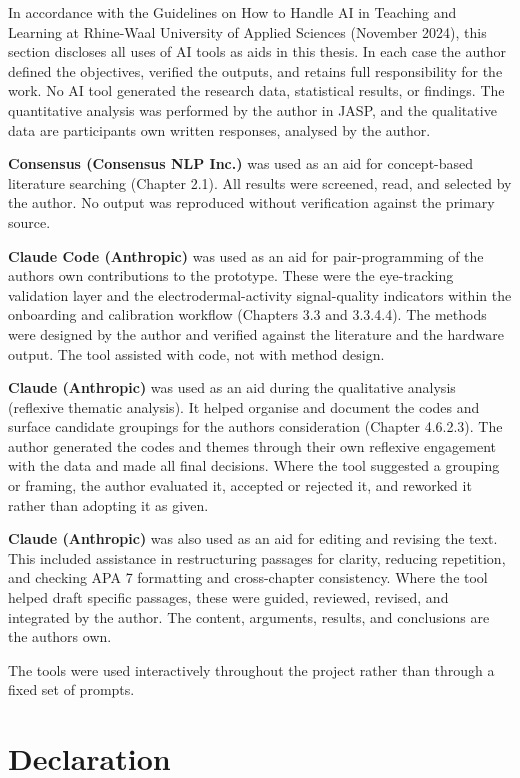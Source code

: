 \documentclass[
]{article}
\begin{document}
In accordance with the Guidelines on How to Handle AI in Teaching and Learning at Rhine-Waal University of Applied Sciences (November 2024), this section discloses all uses of AI tools as aids in this thesis. In each case the author defined the objectives, verified the outputs, and retains full responsibility for the work. No AI tool generated the research data, statistical results, or findings. The quantitative analysis was performed by the author in JASP, and the qualitative data are participants\textquotesingle{} own written responses, analysed by the author.

\textbf{Consensus (Consensus NLP Inc.)} was used as an aid for concept-based literature searching (Chapter 2.1). All results were screened, read, and selected by the author. No output was reproduced without verification against the primary source.

\textbf{Claude Code (Anthropic)} was used as an aid for pair-programming of the author\textquotesingle s own contributions to the prototype. These were the eye-tracking validation layer and the electrodermal-activity signal-quality indicators within the onboarding and calibration workflow (Chapters 3.3 and 3.3.4.4). The methods were designed by the author and verified against the literature and the hardware output. The tool assisted with code, not with method design.

\textbf{Claude (Anthropic)} was used as an aid during the qualitative analysis (reflexive thematic analysis). It helped organise and document the codes and surface candidate groupings for the author\textquotesingle s consideration (Chapter 4.6.2.3). The author generated the codes and themes through their own reflexive engagement with the data and made all final decisions. Where the tool suggested a grouping or framing, the author evaluated it, accepted or rejected it, and reworked it rather than adopting it as given.

\textbf{Claude (Anthropic)} was also used as an aid for editing and revising the text. This included assistance in restructuring passages for clarity, reducing repetition, and checking APA 7 formatting and cross-chapter consistency. Where the tool helped draft specific passages, these were guided, reviewed, revised, and integrated by the author. The content, arguments, results, and conclusions are the author\textquotesingle s own.

The tools were used interactively throughout the project rather than through a fixed set of prompts.

\clearpage
\hypertarget{declaration-final}{%
\section{Declaration}\label{declaration-final}}
\end{document}
